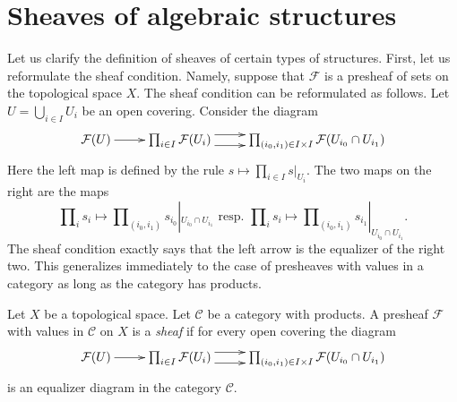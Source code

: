\section{Sheaves of algebraic structures}
\label{section-sheaves-structures}

\noindent
Let us clarify the definition of sheaves of certain types of structures.
First, let us reformulate the sheaf condition. Namely, suppose that
$\mathcal{F}$ is a presheaf of sets on the topological space $X$.
The sheaf condition can be reformulated as follows. Let
$U = \bigcup_{i\in I} U_i$ be an open covering. Consider the
diagram
$$
\xymatrix{
\mathcal{F}(U) \ar[r]
&
\prod\nolimits_{i\in I}
\mathcal{F}(U_i)
\ar@<1ex>[r] \ar@<-1ex>[r]
&
\prod\nolimits_{(i_0, i_1) \in I \times I}
\mathcal{F}(U_{i_0} \cap U_{i_1})
}
$$
Here the left map is defined by the rule
$s \mapsto \prod_{i \in I} s|_{U_i}$. The two maps
on the right are the maps
$$
\prod\nolimits_i s_i
\mapsto
\prod\nolimits_{(i_0, i_1)} s_{i_0}|_{U_{i_0} \cap U_{i_1}}
\text{ resp. }
\prod\nolimits_i s_i
\mapsto
\prod\nolimits_{(i_0, i_1)} s_{i_1}|_{U_{i_0} \cap U_{i_1}}.
$$
The sheaf condition exactly says that the left arrow
is the equalizer of the right two. This generalizes
immediately to the case of presheaves with values in a
category as long as the category has products.

\begin{definition}
\label{definition-sheaf-values-in-category}
Let $X$ be a topological space. Let $\mathcal{C}$ be
a category with products. A presheaf $\mathcal{F}$ with
values in $\mathcal{C}$ on $X$ is a {\it sheaf}
if for every open covering the diagram
$$
\xymatrix{
\mathcal{F}(U) \ar[r]
&
\prod\nolimits_{i\in I}
\mathcal{F}(U_i)
\ar@<1ex>[r] \ar@<-1ex>[r]
&
\prod\nolimits_{(i_0, i_1) \in I \times I}
\mathcal{F}(U_{i_0} \cap U_{i_1})
}
$$
is an equalizer diagram in the category $\mathcal{C}$.
\end{definition}

